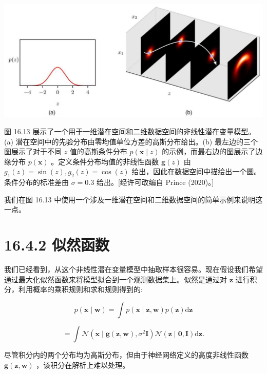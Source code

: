\documentclass[10pt]{article}
\begin{document}
\begin{center}
\includegraphics[max width=1.0\textwidth]{images/0194e279-9b28-703a-88f4-c3ac21e2010d_543_226_367_1266_555_0.jpg}
\end{center}
\hspace*{3em} 

图 16.13 展示了一个用于一维潜在空间和二维数据空间的非线性潜在变量模型。(a) 潜在空间中的先验分布由零均值单位方差的高斯分布给出。(b) 最左边的三个图展示了对于不同 \(z\) 值的高斯条件分布 \(p\left( {\mathbf{x} \mid  z}\right)\) 的示例，而最右边的图展示了边缘分布 \(p\left( \mathbf{x}\right)\) 。定义条件分布均值的非线性函数 \(\mathbf{g}\left( z\right)\) 由 \({g}_{1}\left( z\right)  = \sin \left( z\right) ,{g}_{2}\left( z\right)  = \cos \left( z\right)\) 给出，因此在数据空间中描绘出一个圆。条件分布的标准差由 \(\sigma  = {0.3}\) 给出。[经许可改编自 Prince (2020)。]

我们在图 16.13 中使用一个涉及一维潜在空间和二维数据空间的简单示例来说明这一点。

\section*{16.4.2 似然函数}

我们已经看到，从这个非线性潜在变量模型中抽取样本很容易。现在假设我们希望通过最大化似然函数来将模型拟合到一个观测数据集上。似然是通过对 \(\mathbf{z}\) 进行积分，利用概率的乘积规则和求和规则得到的:

\[
p\left( {\mathbf{x} \mid  \mathbf{w}}\right)  = \int p\left( {\mathbf{x} \mid  \mathbf{z},\mathbf{w}}\right) p\left( \mathbf{z}\right) \mathrm{d}\mathbf{z}
\]

\[
= \int \mathcal{N}\left( {\mathbf{x} \mid  \mathbf{g}\left( {\mathbf{z},\mathbf{w}}\right) ,{\sigma }^{2}\mathbf{I}}\right) \mathcal{N}\left( {\mathbf{z} \mid  \mathbf{0},\mathbf{I}}\right) \mathrm{d}\mathbf{z}. \tag{16.82}
\]

尽管积分内的两个分布均为高斯分布，但由于神经网络定义的高度非线性函数 \(\mathbf{g}\left( {\mathbf{z},\mathbf{w}}\right)\) ，该积分在解析上难以处理。
\end{document}
